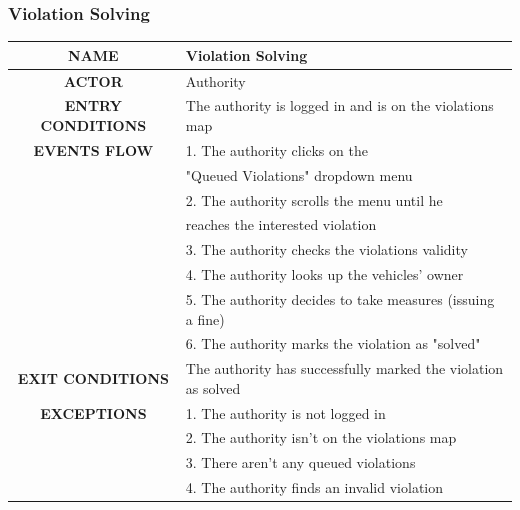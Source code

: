 \documentclass[12pt,a4paper]{article}
\begin{document}
\subsubsection{Violation Solving}
\begin{center}
			\begin{tabular}{| c | l |}
				\hline
				\textbf{NAME} & Violation Solving\\
				\hline
				\textbf{ACTOR} & Authority \\
				\hline
				\textbf{ENTRY CONDITIONS} & The authority is logged in and is on the violations map\\
				\hline
				\textbf{EVENTS FLOW}  &
				1. The authority clicks on the \\
				& "Queued Violations" dropdown menu\\
				&2. The authority scrolls the menu until he\\ 
				& reaches the interested violation\\
				&3. The authority checks the violations validity \\
				&4. The authority looks up the vehicles' owner\\
				&5. The authority decides to take measures (issuing a fine)\\
				&6. The authority marks the violation as "solved"\\
				\hline
				\textbf{EXIT CONDITIONS} & The authority has successfully marked the violation as solved \\ 
				\hline
				\textbf{EXCEPTIONS} &
				1. The authority is not logged in\\
				&2. The authority isn't on the violations map\\
				&3. There aren't any queued violations\\
				&4. The authority finds an invalid violation\\
				\hline
			\end{tabular}
		\end{center}
\newpage
\end{document}
